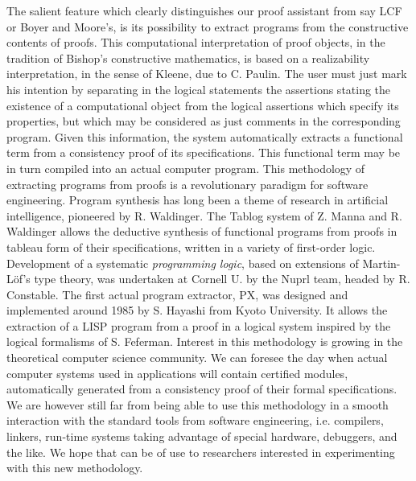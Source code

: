 The salient feature which clearly distinguishes our proof assistant
from say LCF or Boyer and Moore's, is its possibility to extract
programs from the constructive contents of proofs. This computational
interpretation of proof objects, in the tradition of Bishop's
constructive mathematics, is based on a realizability interpretation,
in the sense of Kleene, due to C.  Paulin. The user must just mark his
intention by separating in the logical statements the assertions
stating the existence of a computational object from the logical
assertions which specify its properties, but which may be considered
as just comments in the corresponding program. Given this information,
the system automatically extracts a functional term from a consistency
proof of its specifications.  This functional term may be in turn
compiled into an actual computer program.  This methodology of
extracting programs from proofs is a revolutionary paradigm for
software engineering.  Program synthesis has long been a theme of
research in artificial intelligence, pioneered by R. Waldinger. The
Tablog system of Z. Manna and R. Waldinger allows the deductive
synthesis of functional programs from proofs in tableau form of their
specifications, written in a variety of first-order logic. Development
of a systematic \emph{programming logic}, based on extensions of
Martin-L\"of's type theory, was undertaken at Cornell U. by the Nuprl
team, headed by R. Constable.  The first actual program extractor, PX,
was designed and implemented around 1985 by S. Hayashi from Kyoto
University.  It allows the extraction of a LISP program from a proof
in a logical system inspired by the logical formalisms of S. Feferman.
Interest in this methodology is growing in the theoretical computer
science community. We can foresee the day when actual computer systems
used in applications will contain certified modules, automatically
generated from a consistency proof of their formal specifications. We
are however still far from being able to use this methodology in a
smooth interaction with the standard tools from software engineering,
i.e. compilers, linkers, run-time systems taking advantage of special
hardware, debuggers, and the like. We hope that {\Coq} can be of use
to researchers interested in experimenting with this new methodology.

